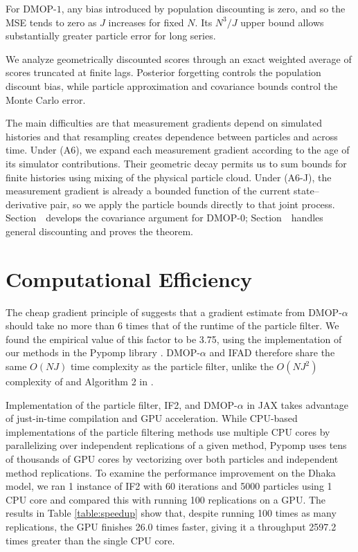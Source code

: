 \documentclass[numsec,webpdf,modern,medium,namedate]{oup-authoring-template}
\begin{document}
For DMOP-$1$, any bias introduced by population discounting is zero, and so the MSE tends to zero as $J$ increases for fixed $N$.
Its $N^3/J$ upper bound allows substantially greater particle error for long series.


We analyze geometrically discounted scores through an exact weighted average of scores truncated at finite lags.
Posterior forgetting controls the population discount bias, while particle approximation and covariance bounds control the Monte Carlo error.

The main difficulties are that measurement gradients depend on simulated histories and that resampling creates dependence between particles and across time.
Under (A6), we expand each measurement gradient according to the age of its simulator contributions.
Their geometric decay permits us to sum bounds for finite histories using mixing of the physical particle cloud.
Under (A6-J), the measurement gradient is already a bounded function of the current state--derivative pair, so we apply the particle bounds directly to that joint process.
Section~\suppSecProofBiasVar\ develops the covariance argument for DMOP-$0$; Section~\suppSecProofSharperBiasVar\ handles general discounting and proves the theorem.


\section{Computational Efficiency} \label{sec:efficiency}

The cheap gradient principle of \cite{kakade2019provably} suggests that a gradient estimate from DMOP-$\alpha$ should take no more than 6 times that of the runtime of the particle filter.
We found the empirical value of this factor to be 3.75, using the implementation of our methods in the Pypomp library \citep{abkemeier25}.
DMOP-$\alpha$ and IFAD therefore share the same $O(NJ)$ time complexity as the particle filter, unlike the $O(NJ^2)$ complexity of \cite{corenflos21} and Algorithm 2 in \citep{poyiadjis11, scibior21}.

Implementation of the particle filter, IF2, and DMOP-$\alpha$ in JAX \citep{jax} takes advantage of just-in-time compilation and GPU acceleration.
While CPU-based implementations of the particle filtering methods use multiple CPU cores by parallelizing over independent replications of a given method, Pypomp uses tens of thousands of GPU cores by vectorizing over both particles and independent method replications.
To examine the performance improvement on the Dhaka model, we ran 1 instance of IF2 with 60 iterations and 5000 particles using 1 CPU core and compared this with running 100 replications on a GPU.
The results in Table \ref{table:speedup} show that, despite running 100 times as many replications, the GPU finishes 26.0 times faster, giving it a throughput 2597.2 times greater than the single CPU core.
\end{document}

